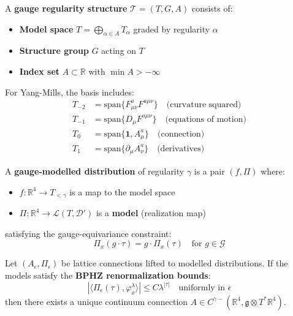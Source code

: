 \begin{definition}
\label{def:gauge-regularity}
A \textbf{gauge regularity structure} $\mathscr{T} = (T, G, A)$ consists of:
\begin{itemize}
\item \textbf{Model space} $T = \bigoplus_{\alpha \in A} T_\alpha$ graded by regularity $\alpha$
\item \textbf{Structure group} $G$ acting on $T$
\item \textbf{Index set} $A \subset \mathbb{R}$ with $\min A > -\infty$
\end{itemize}

For Yang-Mills, the basis includes:
\begin{align}
T_{-2} &= \text{span}\{F_{\mu\nu}^a F^{a\mu\nu}\} \quad \text{(curvature squared)} \\
T_{-1} &= \text{span}\{D_\mu F^{a\mu\nu}\} \quad \text{(equations of motion)} \\
T_0 &= \text{span}\{\mathbf{1}, A_\mu^a\} \quad \text{(connection)} \\
T_1 &= \text{span}\{\partial_\mu A_\nu^a\} \quad \text{(derivatives)}
\end{align}
\end{definition}

\begin{definition}
\label{def:modelled-dist}
A \textbf{gauge-modelled distribution} of regularity $\gamma$ is a pair $(f, \Pi)$ where:
\begin{itemize}
\item $f: \mathbb{R}^4 \to T_{<\gamma}$ is a map to the model space
\item $\Pi: \mathbb{R}^4 \to \mathscr{L}(T, \mathscr{D}')$ is a \textbf{model} (realization map)
\end{itemize}
satisfying the gauge-equivariance constraint:
\begin{equation}
\Pi_x(g \cdot \tau) = g \cdot \Pi_x(\tau) \quad \text{for } g \in \mathcal{G}
\end{equation}
\end{definition}

\begin{theorem}
\label{thm:gauge-reconstruction}
Let $(A_\epsilon, \Pi_\epsilon)$ be lattice connections lifted to modelled distributions.
If the models satisfy the \textbf{BPHZ renormalization bounds}:
\begin{equation}
|\langle \Pi_\epsilon(\tau), \varphi_x^\lambda \rangle| \leq C \lambda^{|\tau|} \quad \text{uniformly in } \epsilon
\end{equation}
then there exists a unique continuum connection $A \in C^{\gamma-}(\mathbb{R}^4, \mathfrak{g} \otimes T^*\mathbb{R}^4)$.
\end{theorem}


